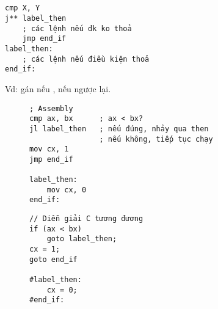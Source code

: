 \documentclass[main.tex]{subfiles}
\begin{document}
\subsection{}
\begin{figure}[H]
\centering
\end{figure}
    

\begin{verbatim}
cmp X, Y
j** label_then 
    ; các lệnh nếu đk ko thoả  
    jmp end_if
label_then:
    ; các lệnh nếu điều kiện thoả 
end_if: 
\end{verbatim}
Vd: gán  nếu ,  nếu ngược lại.
\begin{figure}[H]
\begin{minipage}{0.6\textwidth}
\begin{verbatim}
; Assembly
cmp ax, bx      ; ax < bx?
jl label_then   ; nếu đúng, nhảy qua then 
                ; nếu không, tiếp tục chạy
mov cx, 1
jmp end_if 

label_then:
    mov cx, 0
end_if:    
\end{verbatim}
\end{minipage}
\hfill
\begin{minipage}{0.4\textwidth}
\begin{verbatim}
// Diễn giải C tương đương 
if (ax < bx)
    goto label_then;
cx = 1;
goto end_if

#label_then:
    cx = 0;
#end_if:
\end{verbatim}
\end{minipage}
\end{figure}
\end{document}
